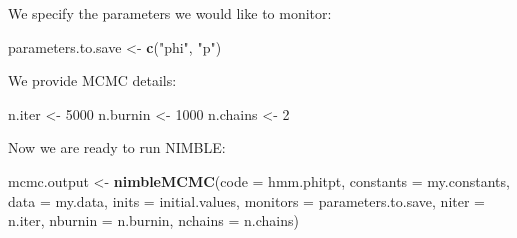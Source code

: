 \documentclass[
  12pt,
]{krantz}
\newenvironment{Shaded}{\begin{snugshade}}{\end{snugshade}}
\newcommand{\AttributeTok}[1]{\textcolor[rgb]{0.13,0.29,0.53}{#1}}
\newcommand{\CommentTok}[1]{\textcolor[rgb]{0.56,0.35,0.01}{\textit{#1}}}
\newcommand{\ControlFlowTok}[1]{\textcolor[rgb]{0.13,0.29,0.53}{\textbf{#1}}}
\newcommand{\DecValTok}[1]{\textcolor[rgb]{0.00,0.00,0.81}{#1}}
\newcommand{\FunctionTok}[1]{\textcolor[rgb]{0.13,0.29,0.53}{\textbf{#1}}}
\newcommand{\NormalTok}[1]{#1}
\newcommand{\OtherTok}[1]{\textcolor[rgb]{0.56,0.35,0.01}{#1}}
\newcommand{\SpecialCharTok}[1]{\textcolor[rgb]{0.81,0.36,0.00}{\textbf{#1}}}
\newcommand{\StringTok}[1]{\textcolor[rgb]{0.31,0.60,0.02}{#1}}
\begin{document}
\begin{Shaded}
\end{Shaded}

We specify the parameters we would like to monitor:

\begin{Shaded}
\begin{Highlighting}[]
\NormalTok{parameters.to.save }\OtherTok{\textless{}{-}} \FunctionTok{c}\NormalTok{(}\StringTok{"phi"}\NormalTok{, }\StringTok{"p"}\NormalTok{)}
\end{Highlighting}
\end{Shaded}

We provide MCMC details:

\begin{Shaded}
\begin{Highlighting}[]
\NormalTok{n.iter }\OtherTok{\textless{}{-}} \DecValTok{5000}
\NormalTok{n.burnin }\OtherTok{\textless{}{-}} \DecValTok{1000}
\NormalTok{n.chains }\OtherTok{\textless{}{-}} \DecValTok{2}
\end{Highlighting}
\end{Shaded}

Now we are ready to run NIMBLE:

\begin{Shaded}
\begin{Highlighting}[]
\NormalTok{mcmc.output }\OtherTok{\textless{}{-}} \FunctionTok{nimbleMCMC}\NormalTok{(}\AttributeTok{code =}\NormalTok{ hmm.phitpt,}
                          \AttributeTok{constants =}\NormalTok{ my.constants,}
                          \AttributeTok{data =}\NormalTok{ my.data,}
                          \AttributeTok{inits =}\NormalTok{ initial.values,}
                          \AttributeTok{monitors =}\NormalTok{ parameters.to.save,}
                          \AttributeTok{niter =}\NormalTok{ n.iter,}
                          \AttributeTok{nburnin =}\NormalTok{ n.burnin,}
                          \AttributeTok{nchains =}\NormalTok{ n.chains)}
\end{Highlighting}
\end{Shaded}
\end{document}
